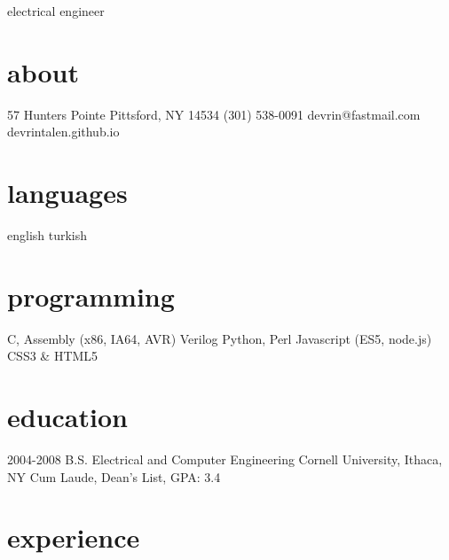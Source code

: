 \documentclass[]{friggeri-cv}
\begin{document}
       {electrical engineer}

\begin{aside}
  \section{about}
    57 Hunters Pointe
    Pittsford, NY 14534
    (301) 538-0091
    devrin@fastmail.com
    devrintalen.github.io
  \section{languages}
    english
    turkish
  \section{programming}
    C, Assembly
    (x86, IA64, AVR)
    Verilog
    Python, Perl
    Javascript
    (ES5, node.js)
    CSS3 \& HTML5
\end{aside}




\section{education}

\begin{entrylist}
  \entry
    {2004-2008}
    {B.S. {\normalfont Electrical and Computer Engineering}}
    {Cornell University, Ithaca, NY}
    {Cum Laude, Dean's List, GPA: 3.4}
\end{entrylist}

\section{experience}
\end{document}
